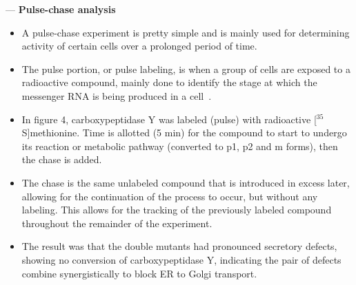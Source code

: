 \documentclass[basic,plain]{inVerba-notes}
\begin{document}
 --- \textbf{Pulse-chase analysis}
\begin{itemize}
  \item A pulse-chase experiment is pretty simple and is mainly used for determining activity of certain cells over a prolonged period of time.
  \item The pulse portion, or pulse labeling, is when a group of cells are exposed to a radioactive compound, mainly done to identify the stage at which the messenger RNA is being produced in a cell~\cite{miglani2010developmental}.
  \item In figure 4, carboxypeptidase Y was labeled (pulse) with radioactive [\(^35\)S]methionine. Time is allotted (5 min) for the compound to start to undergo its reaction or metabolic pathway (converted to p1, p2 and m forms), then the chase is added.
  \item The chase is the same unlabeled compound that is introduced in excess later, allowing for the continuation of the process to occur, but without any labeling. This allows for the tracking of the previously labeled compound throughout the remainder of the experiment.
  \item The result was that the double mutants had pronounced secretory defects, showing no conversion of carboxypeptidase Y, indicating the pair of defects combine synergistically to block ER to Golgi transport.
\end{itemize}

\newpage
{}
\bigskip

\begin{center}
\end{center}

\nocite{perez2009understanding}


\end{document}
